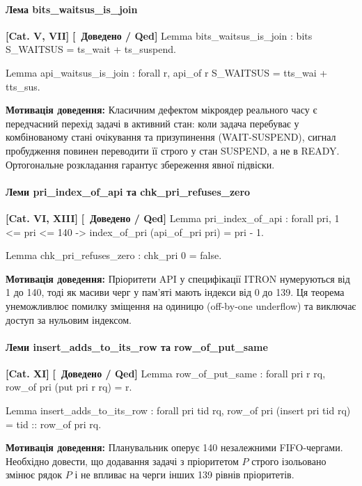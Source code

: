 \documentclass{article}
\let\originalfootnotesize\footnotesize
\let\oldverbatim\verbatim
\let\oldendverbatim\endverbatim
\renewenvironment{verbatim}{\originalfootnotesize\oldverbatim}{\oldendverbatim}
\newcommand{\thmcategory}[1]{{\small\textbf{\color{coreblue}[#1]}}}
\newcommand{\thmproven}{{\small\textbf{\color{productgreen}[\checkmark\ Доведено / Qed]}}}
\newcommand{\thmmotivation}[1]{%
  \par\smallskip\noindent\colorbox{boxbg}{\parbox{\dimexpr\linewidth-2\fboxsep\relax}{%
    \small\textbf{Мотивація доведення:} #1%
  }}\par\medskip
}
\begin{document}
\paragraph{Лема bits\_waitsus\_is\_join} \thmcategory{Cat. V, VII} \thmproven
\begin{verbatim}
Lemma bits_waitsus_is_join :
  bits S_WAITSUS = ts_wait + ts_suspend.

Lemma api_waitsus_is_join : forall r,
  api_of r S_WAITSUS = tts_wai + tts_sus.
\end{verbatim}
\thmmotivation{Класичним дефектом мікроядер реального часу є передчасний перехід задачі в активний стан: коли задача перебуває у комбінованому стані очікування та призупинення (WAIT-SUSPEND), сигнал пробудження повинен переводити її строго у стан SUSPEND, а не в READY. Ортогональне розкладання гарантує збереження явної підвіски.}

\paragraph{Леми pri\_index\_of\_api та chk\_pri\_refuses\_zero} \thmcategory{Cat. VI, XIII} \thmproven
\begin{verbatim}
Lemma pri_index_of_api : forall pri,
  1 <= pri <= 140 ->
  index_of_pri (api_of_pri pri) = pri - 1.

Lemma chk_pri_refuses_zero :
  chk_pri 0 = false.
\end{verbatim}
\thmmotivation{Пріоритети API у специфікації ITRON нумеруються від 1 до 140, тоді як масиви черг у пам'яті мають індекси від 0 до 139. Ця теорема унеможливлює помилку зміщення на одиницю (off-by-one underflow) та виключає доступ за нульовим індексом.}

\paragraph{Леми insert\_adds\_to\_its\_row та row\_of\_put\_same} \thmcategory{Cat. XI} \thmproven
\begin{verbatim}
Lemma row_of_put_same : forall pri r rq,
  row_of pri (put pri r rq) = r.

Lemma insert_adds_to_its_row : forall pri tid rq,
  row_of pri (insert pri tid rq) = tid :: row_of pri rq.
\end{verbatim}
\thmmotivation{Планувальник оперує 140 незалежними FIFO-чергами. Необхідно довести, що додавання задачі з пріоритетом $P$ строго ізольовано змінює рядок $P$ і не впливає на черги інших 139 рівнів пріоритетів.}
\end{document}
